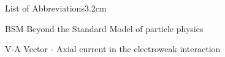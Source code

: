 \begin{mclistof}{List of Abbreviations}{3.2cm}

\item[BSM] Beyond the Standard Model of particle physics
\item[V-A] Vector - Axial current in the electroweak interaction
\end{mclistof} 
